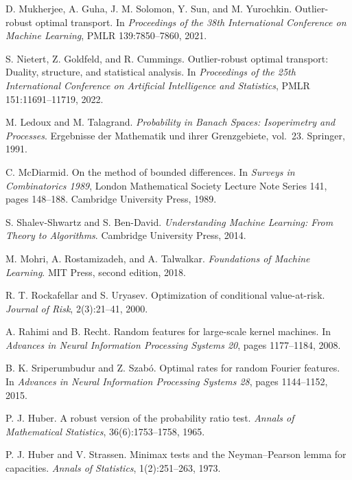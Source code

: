 D. Mukherjee, A. Guha, J. M. Solomon, Y. Sun, and M. Yurochkin.
\newblock Outlier-robust optimal transport.
\newblock In \emph{Proceedings of the 38th International Conference on Machine Learning}, PMLR 139:7850--7860, 2021.

S. Nietert, Z. Goldfeld, and R. Cummings.
\newblock Outlier-robust optimal transport: Duality, structure, and statistical analysis.
\newblock In \emph{Proceedings of the 25th International Conference on Artificial Intelligence and Statistics}, PMLR 151:11691--11719, 2022.

M. Ledoux and M. Talagrand.
\newblock \emph{Probability in Banach Spaces: Isoperimetry and Processes}.
\newblock Ergebnisse der Mathematik und ihrer Grenzgebiete, vol.~23. Springer, 1991.

C. McDiarmid.
\newblock On the method of bounded differences.
\newblock In \emph{Surveys in Combinatorics 1989}, London Mathematical Society Lecture Note Series 141, pages 148--188. Cambridge University Press, 1989.

S. Shalev-Shwartz and S. Ben-David.
\newblock \emph{Understanding Machine Learning: From Theory to Algorithms}.
\newblock Cambridge University Press, 2014.

M. Mohri, A. Rostamizadeh, and A. Talwalkar.
\newblock \emph{Foundations of Machine Learning}.
\newblock MIT Press, second edition, 2018.

R. T. Rockafellar and S. Uryasev.
\newblock Optimization of conditional value-at-risk.
\newblock \emph{Journal of Risk}, 2(3):21--41, 2000.

A. Rahimi and B. Recht.
\newblock Random features for large-scale kernel machines.
\newblock In \emph{Advances in Neural Information Processing Systems 20}, pages 1177--1184, 2008.

B. K. Sriperumbudur and Z. Szab\'o.
\newblock Optimal rates for random Fourier features.
\newblock In \emph{Advances in Neural Information Processing Systems 28}, pages 1144--1152, 2015.

P. J. Huber.
\newblock A robust version of the probability ratio test.
\newblock \emph{Annals of Mathematical Statistics}, 36(6):1753--1758, 1965.

P. J. Huber and V. Strassen.
\newblock Minimax tests and the Neyman--Pearson lemma for capacities.
\newblock \emph{Annals of Statistics}, 1(2):251--263, 1973.

